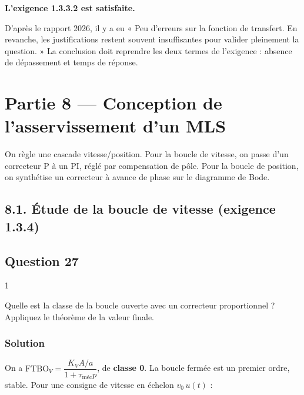 \documentclass[11pt,a4paper]{article}
\begin{document}
\textbf{L'exigence 1.3.3.2 est satisfaite.}

\begin{jury}

D'après le rapport 2026, il y a eu « Peu d'erreurs sur la fonction de transfert. En revanche, les justifications restent souvent insuffisantes pour valider pleinement la question. » La conclusion doit reprendre les deux termes de l'exigence : absence de dépassement et temps de réponse.

\end{jury}

\hypertarget{partie-8-conception-de-lasservissement-dun-mls}{%
\section{Partie 8 --- Conception de l'asservissement d'un MLS}\label{partie-8-conception-de-lasservissement-dun-mls}}

On règle une cascade vitesse/position. Pour la boucle de vitesse, on passe d'un correcteur P à un PI, réglé par compensation de pôle. Pour la boucle de position, on synthétise un correcteur à avance de phase sur le diagramme de Bode.

\hypertarget{uxe9tude-de-la-boucle-de-vitesse-exigence-1.3.4}{%
\subsection{8.1. Étude de la boucle de vitesse (exigence 1.3.4)}\label{uxe9tude-de-la-boucle-de-vitesse-exigence-1.3.4}}

\hypertarget{question-27}{%
\subsection{Question 27}\label{question-27}}

\begin{indication}{1}

Quelle est la classe de la boucle ouverte avec un correcteur proportionnel ? Appliquez le théorème de la valeur finale.

\end{indication}

\hypertarget{solution-26}{%
\subsubsection{Solution}\label{solution-26}}

On a \(\text{FTBO}_V = \dfrac{K_VA/a}{1+\tau_{\text{méc}}p}\), de \textbf{classe 0}. La boucle fermée est un premier ordre, stable. Pour une consigne de vitesse en échelon \(v_0\,u(t)\) :
\end{document}
